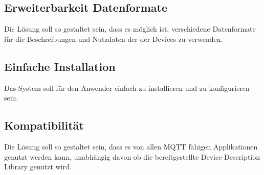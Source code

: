 \subsection{Erweiterbarkeit Datenformate}
Die Lösung soll so gestaltet sein, dass es möglich ist, verschiedene Datenformate für die Beschreibungen und Nutzdaten der der Devices zu verwenden.

\subsection{Einfache Installation}
Das System soll für den Anwender einfach zu installieren und zu konfigurieren sein.

\subsection{Kompatibilität}
Die Lösung soll so gestaltet sein, dass es von allen MQTT fähigen Applikationen genutzt werden kann, unabhängig davon ob die bereitgestellte Device Description Library genutzt wird.